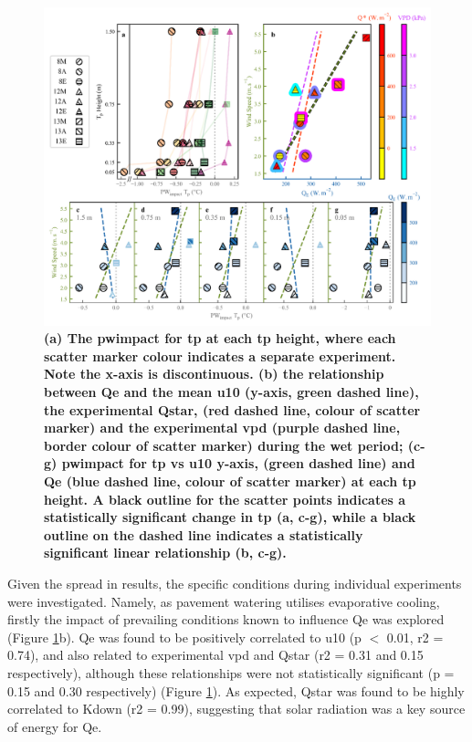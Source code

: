 \documentclass[final,3p,times,authoryear]{elsarticle}
\begin{document}
\begin{figure}
\centering
\includegraphics[trim={0 0 0 0},clip,scale=1.0]{pict014.png}
\caption{\bf (a) The \gls{pwimpact} for \gls{tp} at each \gls{tp} height, where each scatter marker colour indicates a separate experiment. Note the x-axis is discontinuous. (b) the relationship between \gls{Qe} and the mean \gls{u10} (y-axis, green dashed line), the experimental \gls{Qstar}, (red dashed line, colour of scatter marker) and the experimental \gls{vpd} (purple dashed line, border colour of scatter marker) during the wet period; (c-g) \gls{pwimpact} for \gls{tp} vs \gls{u10} y-axis, (green dashed line) and \gls{Qe} (blue dashed line, colour of scatter marker) at each \gls{tp} height. A black outline for the scatter points indicates a statistically significant change in \gls{tp} (a, c-g), while a black outline on the dashed line indicates a statistically significant linear relationship (b, c-g).}
 \label{fig:3.3}
\end{figure}

Given the spread in results, the specific conditions during individual experiments were investigated. Namely, as pavement watering utilises evaporative cooling, firstly the impact of prevailing conditions known to influence \gls{Qe} was explored (Figure \ref{fig:3.3}b). \gls{Qe} was found to be positively correlated to \gls{u10} (\gls{p} $<$ 0.01, \gls{r2} = 0.74), and also related to experimental \gls{vpd} and \gls{Qstar} (\gls{r2} = 0.31 and 0.15 respectively), although these relationships were not statistically significant (\gls{p} = 0.15 and 0.30 respectively) (Figure \ref{fig:3.3}). As expected, \gls{Qstar} was found to be highly correlated to \gls{Kdown} (\gls{r2} = 0.99), suggesting that solar radiation was a key source of energy for \gls{Qe}.
\end{document}
